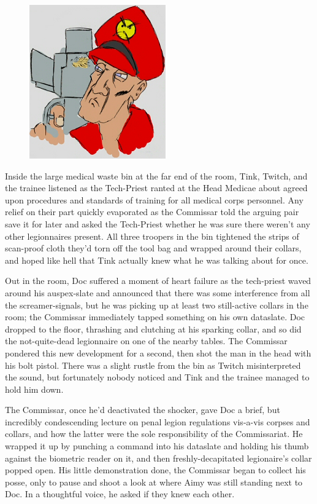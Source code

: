 \begin{figure}
	\begin{center}
		\includegraphics[width=\figwidth]{pics/21/30.png}
	\end{center}
\end{figure}
Inside the large medical waste bin at the far end of the room, Tink, Twitch, and the trainee listened as the Tech-Priest ranted at the Head Medicae about agreed upon procedures and standards of training for all medical corps personnel. 
Any relief on their part quickly evaporated as the Commissar told the arguing pair save it for later and asked the Tech-Priest whether he was sure there weren't any other legionnaires present. 
All three troopers in the bin tightened the strips of scan-proof cloth they'd torn off the tool bag and wrapped around their collars, and hoped like hell that Tink actually knew what he was talking about for once.

Out in the room, Doc suffered a moment of heart failure as the tech-priest waved around his auspex-slate and announced that there was some interference from all the screamer-signals, but he was picking up at least two still-active collars in the room; 
the Commissar immediately tapped something on his own dataslate. 
Doc dropped to the floor, thrashing and clutching at his sparking collar, and so did the not-quite-dead legionnaire on one of the nearby tables. 
The Commissar pondered this new development for a second, then shot the man in the head with his bolt pistol. 
There was a slight rustle from the bin as Twitch misinterpreted the sound, but fortunately nobody noticed and Tink and the trainee managed to hold him down.

The Commissar, once he'd deactivated the shocker, gave Doc a brief, but incredibly condescending lecture on penal legion regulations vis-a-vis corpses and collars, and how the latter were the sole responsibility of the Commissariat. 
He wrapped it up by punching a command into his dataslate and holding his thumb against the biometric reader on it, and then freshly-decapitated legionaire's collar popped open. 
His little demonstration done, the Commissar began to collect his posse, only to pause and shoot a look at where Aimy was still standing next to Doc. 
In a thoughtful voice, he asked if they knew each other.


